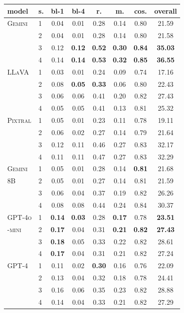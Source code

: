 \documentclass{article}
\begin{document}
\begin{table} [H]
\vskip 0.15in
\begin{center}
\begin{small}

\begin{tabular}{llcccccc}
\toprule
model & s. & bl-1 & bl-4 & r. & m. & cos. & overall \\
\midrule
\textsc{Gemini} & 1 & 0.04 & 0.01 & 0.28 & 0.14 & 0.80 & 21.59 \\
 & 2 & 0.04 & 0.01 & 0.28 & 0.14 & 0.80 & 21.58 \\
 & 3 & 0.12 & \textbf{0.12} & \textbf{0.52} & \textbf{0.30} & \textbf{0.84} & \textbf{35.03} \\
 & 4 & 0.14 & \textbf{0.14} & \textbf{0.53} & \textbf{0.32} & \textbf{0.85} & \textbf{36.55} \\
\midrule
\textsc{LLaVA} & 1 & 0.03 & 0.01 & 0.24 & 0.09 & 0.74 & 17.16 \\
 & 2 & 0.08 & \textbf{0.05} & \textbf{0.33} & 0.06 & 0.80 & 22.43 \\
 & 3 & 0.06 & 0.06 & 0.41 & 0.20 & 0.82 & 27.43 \\
 & 4 & 0.05 & 0.05 & 0.41 & 0.13 & 0.81 & 25.32 \\
\midrule
\textsc{Pixtral} & 1 & 0.05 & 0.01 & 0.23 & 0.11 & 0.78 & 19.11 \\
 & 2 & 0.06 & 0.02 & 0.27 & 0.14 & 0.79 & 21.64 \\
 & 3 & 0.12 & 0.11 & 0.46 & 0.27 & 0.83 & 32.17 \\
 & 4 & 0.11 & 0.11 & 0.47 & 0.27 & 0.83 & 32.29 \\
\midrule
\textsc{Gemini}  & 1 & 0.05 & 0.01 & 0.28 & 0.14 & \textbf{0.81} & 21.68 \\
\textsc{8B} & 2 & 0.05 & 0.01 & 0.27 & 0.14 & 0.81 & 21.59 \\
 & 3 & 0.06 & 0.04 & 0.37 & 0.19 & 0.82 & 26.26 \\
 & 4 & 0.08 & 0.08 & 0.44 & 0.24 & 0.84 & 30.37 \\
\midrule
\textsc{GPT-4o} & 1 & \textbf{0.14} & \textbf{0.03} & 0.28 & \textbf{0.17} & 0.78 & \textbf{23.51} \\
\textsc{-mini} & 2 & \textbf{0.17} & 0.04 & 0.31 & \textbf{0.21} & \textbf{0.82} & \textbf{27.43} \\
 & 3 & \textbf{0.18} & 0.05 & 0.33 & 0.22 & 0.82 & 28.61 \\
 & 4 & \textbf{0.17} & 0.04 & 0.31 & 0.21 & 0.82 & 27.24 \\
\midrule
\textsc{GPT-4} & 1 & 0.11 & 0.02 & \textbf{0.30} & 0.16 & 0.76 & 22.09 \\
 & 2 & 0.13 & 0.04 & 0.32 & 0.18 & 0.78 & 24.41 \\
 & 3 & 0.16 & 0.06 & 0.35 & 0.23 & 0.82 & 28.88 \\
 & 4 & 0.14 & 0.04 & 0.33 & 0.21 & 0.82 & 27.29 \\
\bottomrule
\end{tabular}



\end{small}
\end{center}
\end{table}
\end{document}
